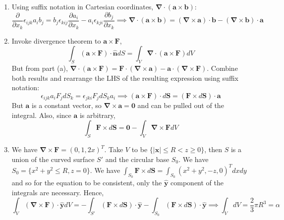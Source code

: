 \documentclass[a4paper]{article}
\begin{document}
\begin{ans}\leavevmode
\begin{enumerate}[label=(\alph*)]
    \item Using suffix notation in Cartesian coordinates, $\boldsymbol{\nabla}\cdot(\mathbf{a}\times\mathbf{b})$:
$$\frac{\partial}{\partial x_k}\epsilon_{ijk}a_ib_j=b_j\epsilon_{kij}\frac{\partial a_i}{\partial x_k}-a_i\epsilon_{kji}\frac{\partial b_j}{\partial x_k}\implies\boldsymbol{\nabla}\cdot(\mathbf{a}\times\mathbf{b})=(\boldsymbol{\nabla}\times\mathbf{a})\cdot\mathbf{b}-(\boldsymbol{\nabla}\times\mathbf{b})\cdot\mathbf{a}$$
\item Invoke divergence theorem to $\mathbf{a}\times\mathbf{F}$,
$$\int_S(\mathbf{a}\times\mathbf{F})\cdot\mathbf{\hat{n}}dS=\int_V\boldsymbol{\nabla}\cdot(\mathbf{a}\times\mathbf{F})dV$$
But from part (a), $\boldsymbol{\nabla}\cdot(\mathbf{a}\times\mathbf{F})=\mathbf{F}\cdot(\boldsymbol{\nabla}\times\mathbf{a})-\mathbf{a}\cdot(\boldsymbol{\nabla}\times\mathbf{F})$. Combine both results and rearrange the LHS of the resulting expression using suffix notation:
$$\epsilon_{ijk}a_iF_jdS_k=\epsilon_{jki}F_jdS_ka_i\implies(\mathbf{a}\times\mathbf{F})\cdot d\mathbf{S}=(\mathbf{F}\times d\mathbf{S})\cdot\mathbf{a}$$
But $\mathbf{a}$ is a constant vector, so $\boldsymbol{\nabla}\times\mathbf{a}=\boldsymbol{0}$ and can be pulled out of the integral. Also, since $\mathbf{a}$ is arbitrary,
$$\int_S\mathbf{F}\times d\mathbf{S}=\boldsymbol{0}-\int_V\boldsymbol{\nabla}\times\mathbf{F}dV$$
\item We have $\boldsymbol{\nabla}\times\mathbf{F}=(0,1,2x)^T$. Take $V$ to be $\{|\mathbf{x}|\leq R<z\geq 0\}$, then $S$ is a union of the curved surface $S'$ and the circular base $S_0$. We have $S_0=\{x^2+y^2\leq R,z=0\}$. We have $\int_{S_0}\mathbf{F}\times d\mathbf{S}=\int_{S_0}(x^2+y^2,-z,0)^Tdxdy$ and so for the equation to be consistent, only the $\mathbf{\hat{y}}$ component of the integrals are necessary. Hence,
$$\int_V(\boldsymbol{\nabla}\times\mathbf{F})\cdot\mathbf{\hat{y}}dV=-\int_{S'}(\mathbf{F}\times d\mathbf{S})\cdot\mathbf{\hat{y}}-\int_{S_0}(\mathbf{F}\times d\mathbf{S})\cdot\mathbf{\hat{y}}\implies \int_VdV=\frac{2}{3}\pi R^3=\alpha$$
\end{enumerate}
\end{ans}
\newpage
\end{document}
